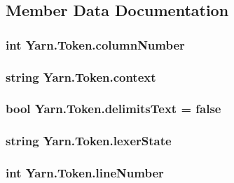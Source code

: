 \subsection{Member Data Documentation}
\hypertarget{a00147_a9a0f0a8a7ab1e90ab48f15192323ffca}{
\subsubsection[{column\-Number}]{\setlength{\rightskip}{0pt plus 5cm}int Yarn.\-Token.\-column\-Number}}\label{a00147_a9a0f0a8a7ab1e90ab48f15192323ffca}
\hypertarget{a00147_a089d248c904a6e8366b81c2c47ff5af8}{
\subsubsection[{context}]{\setlength{\rightskip}{0pt plus 5cm}string Yarn.\-Token.\-context}}\label{a00147_a089d248c904a6e8366b81c2c47ff5af8}
\hypertarget{a00147_af15d26fa4e6f276ab58ff66d3c4203da}{
\subsubsection[{delimits\-Text}]{\setlength{\rightskip}{0pt plus 5cm}bool Yarn.\-Token.\-delimits\-Text = false}}\label{a00147_af15d26fa4e6f276ab58ff66d3c4203da}
\hypertarget{a00147_a710099e7abe84f30864a320cc7464214}{
\subsubsection[{lexer\-State}]{\setlength{\rightskip}{0pt plus 5cm}string Yarn.\-Token.\-lexer\-State}}\label{a00147_a710099e7abe84f30864a320cc7464214}
\hypertarget{a00147_a80fe710713201bb793a41452e314a721}{
\subsubsection[{line\-Number}]{\setlength{\rightskip}{0pt plus 5cm}int Yarn.\-Token.\-line\-Number}}\label{a00147_a80fe710713201bb793a41452e314a721}
